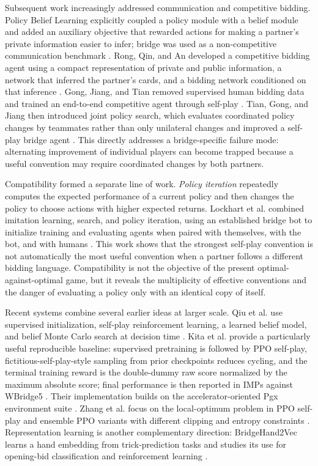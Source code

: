 \documentclass[11pt]{article}
\begin{document}
Subsequent work increasingly addressed communication and competitive bidding. Policy Belief Learning explicitly coupled a policy module with a belief module and added an auxiliary objective that rewarded actions for making a partner's private information easier to infer; bridge was used as a non-competitive communication benchmark \cite{tian2020communicate}. Rong, Qin, and An developed a competitive bidding agent using a compact representation of private and public information, a network that inferred the partner's cards, and a bidding network conditioned on that inference \cite{rong2019competitive}. Gong, Jiang, and Tian removed supervised human bidding data and trained an end-to-end competitive agent through self-play \cite{gong2019simple}. Tian, Gong, and Jiang then introduced joint policy search, which evaluates coordinated policy changes by teammates rather than only unilateral changes and improved a self-play bridge agent \cite{tian2020joint}. This directly addresses a bridge-specific failure mode: alternating improvement of individual players can become trapped because a useful convention may require coordinated changes by both partners.

Compatibility formed a separate line of work. \emph{Policy iteration} repeatedly computes the expected performance of a current policy and then changes the policy to choose actions with higher expected returns. Lockhart et al. combined imitation learning, search, and policy iteration, using an established bridge bot to initialize training and evaluating agents when paired with themselves, with the bot, and with humans \cite{lockhart2020human}. This work shows that the strongest self-play convention is not automatically the most useful convention when a partner follows a different bidding language. Compatibility is not the objective of the present optimal-against-optimal game, but it reveals the multiplicity of effective conventions and the danger of evaluating a policy only with an identical copy of itself.

Recent systems combine several earlier ideas at larger scale. Qiu et al. use supervised initialization, self-play reinforcement learning, a learned belief model, and belief Monte Carlo search at decision time \cite{qiu2024bridge}. Kita et al. provide a particularly useful reproducible baseline: supervised pretraining is followed by PPO self-play, fictitious-self-play-style sampling from prior checkpoints reduces cycling, and the terminal training reward is the double-dummy raw score normalized by the maximum absolute score; final performance is then reported in IMPs against WBridge5 \cite{kita2024simple}. Their implementation builds on the accelerator-oriented Pgx environment suite \cite{koyamada2023pgx}. Zhang et al. focus on the local-optimum problem in PPO self-play and ensemble PPO variants with different clipping and entropy constraints \cite{zhang2025diverse}. Representation learning is another complementary direction: BridgeHand2Vec learns a hand embedding from trick-prediction tasks and studies its use for opening-bid classification and reinforcement learning \cite{sztyber2023bridgehand}.
\end{document}
